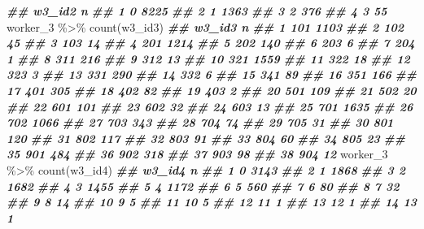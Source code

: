 \documentclass[
]{book}
\newenvironment{Shaded}{\begin{snugshade}}{\end{snugshade}}
\newcommand{\DocumentationTok}[1]{\textcolor[rgb]{0.56,0.35,0.01}{\textbf{\textit{#1}}}}
\newcommand{\FunctionTok}[1]{\textcolor[rgb]{0.00,0.00,0.00}{#1}}
\newcommand{\NormalTok}[1]{#1}
\newcommand{\SpecialCharTok}[1]{\textcolor[rgb]{0.00,0.00,0.00}{#1}}
\theoremstyle{definition}
\theoremstyle{definition}
\theoremstyle{definition}
\theoremstyle{definition}
\theoremstyle{remark}
\begin{document}
\begin{Shaded}
\begin{Highlighting}[]
\DocumentationTok{\#\#   w3\_id2    n}
\DocumentationTok{\#\# 1      0 8225}
\DocumentationTok{\#\# 2      1 1363}
\DocumentationTok{\#\# 3      2  376}
\DocumentationTok{\#\# 4      3   55}
\NormalTok{worker\_3 }\SpecialCharTok{\%\textgreater{}\%} 
  \FunctionTok{count}\NormalTok{(w3\_id3)}
\DocumentationTok{\#\#    w3\_id3    n}
\DocumentationTok{\#\# 1     101 1103}
\DocumentationTok{\#\# 2     102   45}
\DocumentationTok{\#\# 3     103   14}
\DocumentationTok{\#\# 4     201 1214}
\DocumentationTok{\#\# 5     202  140}
\DocumentationTok{\#\# 6     203    6}
\DocumentationTok{\#\# 7     204    1}
\DocumentationTok{\#\# 8     311  216}
\DocumentationTok{\#\# 9     312   13}
\DocumentationTok{\#\# 10    321 1559}
\DocumentationTok{\#\# 11    322   18}
\DocumentationTok{\#\# 12    323    3}
\DocumentationTok{\#\# 13    331  290}
\DocumentationTok{\#\# 14    332    6}
\DocumentationTok{\#\# 15    341   89}
\DocumentationTok{\#\# 16    351  166}
\DocumentationTok{\#\# 17    401  305}
\DocumentationTok{\#\# 18    402   82}
\DocumentationTok{\#\# 19    403    2}
\DocumentationTok{\#\# 20    501  109}
\DocumentationTok{\#\# 21    502   20}
\DocumentationTok{\#\# 22    601  101}
\DocumentationTok{\#\# 23    602   32}
\DocumentationTok{\#\# 24    603   13}
\DocumentationTok{\#\# 25    701 1635}
\DocumentationTok{\#\# 26    702 1066}
\DocumentationTok{\#\# 27    703  343}
\DocumentationTok{\#\# 28    704   74}
\DocumentationTok{\#\# 29    705   31}
\DocumentationTok{\#\# 30    801  120}
\DocumentationTok{\#\# 31    802  117}
\DocumentationTok{\#\# 32    803   91}
\DocumentationTok{\#\# 33    804   60}
\DocumentationTok{\#\# 34    805   23}
\DocumentationTok{\#\# 35    901  484}
\DocumentationTok{\#\# 36    902  318}
\DocumentationTok{\#\# 37    903   98}
\DocumentationTok{\#\# 38    904   12}
\NormalTok{worker\_3 }\SpecialCharTok{\%\textgreater{}\%} 
  \FunctionTok{count}\NormalTok{(w3\_id4)}
\DocumentationTok{\#\#    w3\_id4    n}
\DocumentationTok{\#\# 1       0 3143}
\DocumentationTok{\#\# 2       1 1868}
\DocumentationTok{\#\# 3       2 1682}
\DocumentationTok{\#\# 4       3 1455}
\DocumentationTok{\#\# 5       4 1172}
\DocumentationTok{\#\# 6       5  560}
\DocumentationTok{\#\# 7       6   80}
\DocumentationTok{\#\# 8       7   32}
\DocumentationTok{\#\# 9       8   14}
\DocumentationTok{\#\# 10      9    5}
\DocumentationTok{\#\# 11     10    5}
\DocumentationTok{\#\# 12     11    1}
\DocumentationTok{\#\# 13     12    1}
\DocumentationTok{\#\# 14     13    1}
\end{Highlighting}
\end{Shaded}
\end{document}
